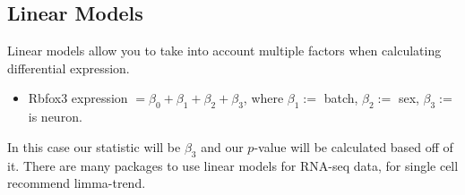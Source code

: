 \documentclass[10pt]{article}
\begin{document}
\subsection*{Linear Models}
Linear models allow you to take into account multiple factors when calculating differential expression.
\begin{itemize}
	\item Rbfox3 expression $= \beta_0 + \beta_1 + \beta_2 + \beta_3$, where $\beta_1 :=$ batch, $\beta_2 :=$ sex, $\beta_3 :=$ is neuron.
\end{itemize}
In this case our statistic will be $\beta_3$ and our $p$-value will be calculated based off of it.  There are many packages to use linear models for RNA-seq data, for single cell recommend limma-trend.
\end{document}
